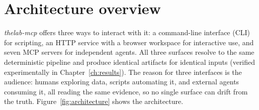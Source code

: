 \section{Architecture overview}
\label{sec:arch}

\emph{thelab-mcp} offers three ways to interact with it: a command-line interface (CLI) for scripting, an HTTP service with a browser workspace for interactive use, and seven MCP servers for independent agents. All three surfaces resolve to the same deterministic pipeline and produce identical artifacts for identical inputs (verified experimentally in Chapter~\ref{ch:results}). The reason for three interfaces is the audience: humans exploring data, scripts automating it, and external agents consuming it, all reading the same evidence, so no single surface can drift from the truth. Figure~\ref{fig:architecture} shows the architecture.
